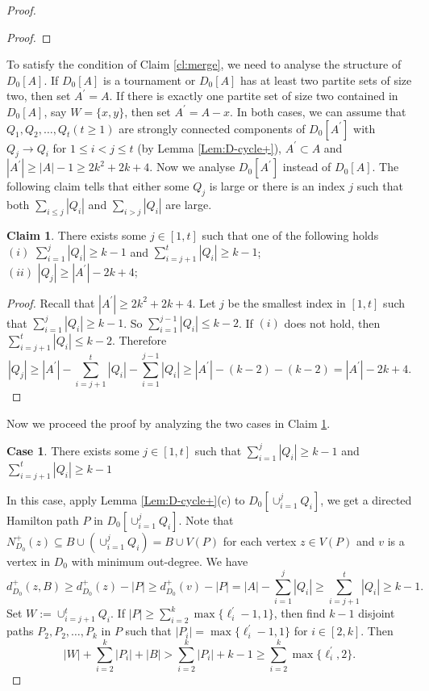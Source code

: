 \documentclass[11pt,a4paper]{article}
\theoremstyle{definition}
\newtheorem{claim}{Claim}
\newtheorem{case}{Case}
\begin{document}
\begin{proof}
\begin{proof}
\end{proof}
To satisfy the condition of Claim \ref{cl:merge}, we need to analyse the structure of $D_0[A]$. If $D_0[A]$ is a tournament or $D_0[A]$ has at least two partite sets of size two, then set $A^\prime=A$. If there is exactly one partite set of size two contained in $D_0[A]$,  say $W=\{x,y\}$, then set $A^{\prime}=A-x$.
In both cases, we can assume that $Q_1,Q_2,\ldots,Q_t (t\geq 1)$ are strongly connected components of $D_0[A^\prime]$ with  $Q_j\rightarrow Q_i$ for $1\leq i<j\leq t$ (by Lemma \ref{Lem:D-cycle+}), $A^\prime\subset A$ and $|A^\prime|\geq |A|-1\geq 2k^2+2k+4$. Now we analyse $D_0[A^\prime]$ instead of $D_0[A]$. The following claim tells that either some $Q_j$ is large or there is an index $j$ such that both $\sum_{i\leq j} |Q_i|$ and $\sum_{i>j} |Q_i|$ are large.


\begin{claim}\label{Cl:two-cases}
   There exists some $j\in[1,t]$ such that one of the following holds\\
   $(i)$ $\sum_{i=1}^j |Q_i|\geq k-1$ and $\sum_{i=j+1}^t |Q_i|\geq k-1$;\\
   $(ii)$ $|Q_j|\geq |A^\prime|-2k+4$;
\end{claim}
\begin{proof}
   Recall that $|A^\prime|\geq 2k^2+2k+4$. Let $j$ be the smallest index in $[1,t]$ such that $\sum_{i=1}^j |Q_i|\geq k-1$. So $\sum_{i=1}^{j-1} |Q_i|\leq k-2$. If $(i)$ does not hold, then  $\sum_{i=j+1}^t |Q_i|\leq k-2$. Therefore
   \[|Q_j|\geq |A^\prime|-\sum_{i=j+1}^t |Q_i|-\sum_{i=1}^{j-1} |Q_i|\geq |A^\prime|-(k-2)-(k-2)=|A^\prime|-2k+4.\]
\end{proof}
\setcounter{case}{0}
Now we proceed the proof by analyzing the two cases in  Claim \ref{Cl:two-cases}.
\begin{case}
   There exists some $j\in[1,t]$ such that $\sum_{i=1}^j |Q_i|\geq k-1$ and $\sum_{i=j+1}^t |Q_i|\geq k-1$
\end{case}
In this case, apply Lemma \ref{Lem:D-cycle+}(c) to $D_0[\cup_{i=1}^j Q_i]$, we get a directed Hamilton path $P$ in $D_0[\cup_{i=1}^j Q_i]$.  Note that $N^+_{D_0}(z)\subseteq B\cup\left(\cup_{i=1}^j Q_i\right)=B\cup V(P)$ for each vertex $z\in V(P)$ and $v$ is a vertex in $D_0$ with minimum out-degree. We have
$$d^+_{D_0}(z,B)\geq d^+_{D_0}(z)-|P|\geq d^+_{D_0}(v)-|P|=|A|-\sum_{i=1}^j |Q_i|\geq \sum_{i=j+1}^t |Q_i|\geq k-1.$$
Set $W:=\cup_{i=j+1}^t Q_i.$
If $|P|\geq \sum_{i=2}^k \max\{\ell^\prime_i-1,1\}$, then find $k-1$ disjoint paths $P_2,P_2,\ldots,P_k$ in $P$ such that $|P_i|= \max\{\ell^\prime_i-1,1\}$ for $i\in [2,k]$. Then
$$|W|+\sum_{i=2}^k|P_i|+|B|>\sum_{i=2}^k|P_i|+k-1\geq \sum_{i=2}^k \max\{\ell^\prime_i,2\}.$$



\end{proof}
\end{document}
